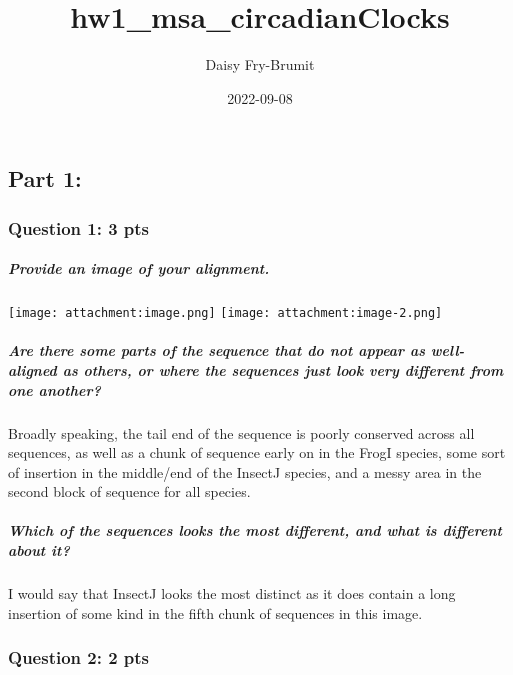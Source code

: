 \documentclass[
]{article}
\title{hw1\_msa\_circadianClocks}
\author{Daisy Fry-Brumit}
\date{2022-09-08}
\begin{document}
\maketitle

\hypertarget{part-1}{%
\subsection{Part 1:}\label{part-1}}

\hypertarget{question-1-3-pts}{%
\subsubsection{Question 1: 3 pts}\label{question-1-3-pts}}

\hypertarget{provide-an-image-of-your-alignment.}{%
\subparagraph{Provide an image of your
alignment.}\label{provide-an-image-of-your-alignment.}}

\texttt{[image: attachment:image.png]}
\texttt{[image: attachment:image-2.png]}

\hypertarget{are-there-some-parts-of-the-sequence-that-do-not-appear-as-well-aligned-as-others-or-where-the-sequences-just-look-very-different-from-one-another}{%
\subparagraph{Are there some parts of the sequence that do not appear as
well-aligned as others, or where the sequences just look very different
from one
another?}\label{are-there-some-parts-of-the-sequence-that-do-not-appear-as-well-aligned-as-others-or-where-the-sequences-just-look-very-different-from-one-another}}

Broadly speaking, the tail end of the sequence is poorly conserved
across all sequences, as well as a chunk of sequence early on in the
FrogI species, some sort of insertion in the middle/end of the InsectJ
species, and a messy area in the second block of sequence for all
species.

\hypertarget{which-of-the-sequences-looks-the-most-different-and-what-is-different-about-it}{%
\subparagraph{Which of the sequences looks the most different, and what
is different about
it?}\label{which-of-the-sequences-looks-the-most-different-and-what-is-different-about-it}}

I would say that InsectJ looks the most distinct as it does contain a
long insertion of some kind in the fifth chunk of sequences in this
image.

\hypertarget{question-2-2-pts}{%
\subsubsection{Question 2: 2 pts}\label{question-2-2-pts}}
\end{document}
